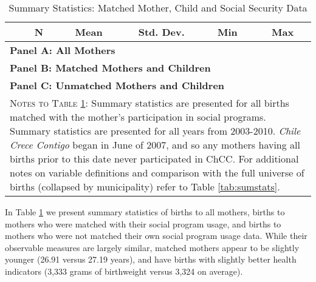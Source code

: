 \documentclass[12pt]{article}
\begin{document}
\begin{spacing}{1.4}
\begin{table}[htpb!]
  \begin{center}
    \caption{Summary Statistics: Matched Mother, Child and Social Security Data}
    \label{tab:sumstatsMother}
    \begin{tabular}{lccccc} \toprule
      & N& Mean & Std. Dev. & Min & Max \\ \midrule
      \multicolumn{6}{l}{\textbf{Panel A: All Mothers}} \\
      
      \multicolumn{6}{l}{\textbf{Panel B: Matched Mothers and Children}} \\
      
      \multicolumn{6}{l}{\textbf{Panel C: Unmatched Mothers and Children}} \\
      
      \bottomrule
      \multicolumn{6}{p{15.4cm}}{{\footnotesize \textsc{Notes to Table \ref{tab:sumstatsMother}}:
          Summary statistics are presented for all births matched with the mother's participation
          in social programs. Summary statistics are presented for all years from 2003-2010.
          \emph{Chile Crece Contigo} began in June of 2007, and so any mothers having all births
          prior to this date never participated in ChCC.  For additional notes on variable definitions
          and comparison with the full universe of births (collapsed by municipality) refer to Table
      \ref{tab:sumstats}.}}
      \end{tabular}
  \end{center}
\end{table}


In Table \ref{tab:sumstatsMother} we present summary statistics of
births to all mothers, births to mothers who were matched with their
social program usage, and births to mothers who were not matched
their own social program usage data.  While their observable measures
are largely similar, matched mothers appear to be slightly younger
(26.91 versus 27.19 years), and have births with slightly better health
indicators (3,333 grams of birthweight versus 3,324 on average).


\end{spacing}
\end{document}
